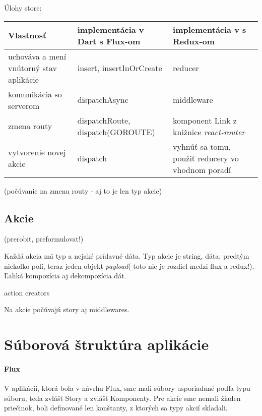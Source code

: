 Úlohy store:\\
\begin{tabular}{| p{4cm} | p{5cm} | p{5cm} |}
 \hline         %
   Vlastnosť & implementácia v Dart s Flux-om & implementácia v \JS{} s Redux-om \\
  \hline
  \hline
   uchováva a mení vnútorný stav aplikácie & 
   insert, insertInOrCreate &
   reducer \\
  \hline
   komunikácia so serverom & 
   dispatchAsync & 
   middleware \\
  \hline
   zmena routy & 
   dispatchRoute, dispatch(GOROUTE) & 
   komponent Link z knižnice \emph{react-router} \\
  \hline
   vytvorenie novej akcie & 
   dispatch & 
   vyhnúť sa tomu, použiť reducery vo vhodnom poradí \\%
  \hline
 \end{tabular}

\TODO{} (počúvanie na zmenu routy - aj to je len typ akcie)

\subsection{Akcie}
\TODO{}(prerobit, preformulovat!)

Každá akcia má typ a nejaké prídavné dáta. %
Typ akcie je string, dáta: predtým niekoľko polí, teraz jeden objekt \emph{payload}(\TODO{} toto nie je rozdiel medzi flux a redux!). Ľahká kompozícia aj dekompozícia dát. %

action creators %

Na akcie počúvajú story aj middlewares.



\section{Súborová štruktúra aplikácie}
\NEW{}
\paragraph{Flux}
V aplikácii, ktorá bola v návrhu Flux, sme mali súbory usporiadané podľa typu súboru, teda zvlášť Story a zvlášť Komponenty. Pre akcie sme nemali žiaden priečinok, boli definované len konštanty, z ktorých sa typy akcií skladali.

